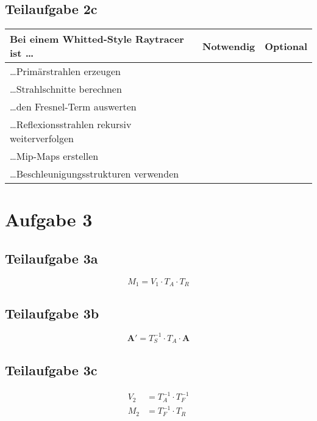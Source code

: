 \documentclass[a4paper]{scrartcl}
\begin{document}
\subsection*{Teilaufgabe 2c}
\begin{tabular}{p{10cm}ll}\toprule
	\textbf{Bei einem Whitted-Style Raytracer ist \dots} & \textbf{Notwendig} & \textbf{Optional} \\\midrule
	\dots Primärstrahlen erzeugen                        & \CheckedBox        & \Square           \\
	\dots Strahlschnitte berechnen                       & \CheckedBox        & \Square           \\
	\dots den Fresnel-Term auswerten                     & \Square            & \CheckedBox       \\
	\dots Reflexionsstrahlen rekursiv weiterverfolgen    & \CheckedBox        & \Square           \\
	\dots Mip-Maps erstellen                             & \Square            & \CheckedBox       \\
	\dots Beschleunigungsstrukturen verwenden            & \Square            & \CheckedBox       \\\bottomrule
\end{tabular}

\section*{Aufgabe 3}
\subsection*{Teilaufgabe 3a}
\[M_1 = V_1 \cdot T_A \cdot T_R\]

\subsection*{Teilaufgabe 3b}
\[\mathbf{A}' = T_S^{-1} \cdot T_A \cdot \mathbf{A}\]

\subsection*{Teilaufgabe 3c}
\begin{align*}
V_2 &= T_A^{-1} \cdot T_F^{-1}\\
M_2 &= T_F^{-1} \cdot T_R
\end{align*}
\end{document}
